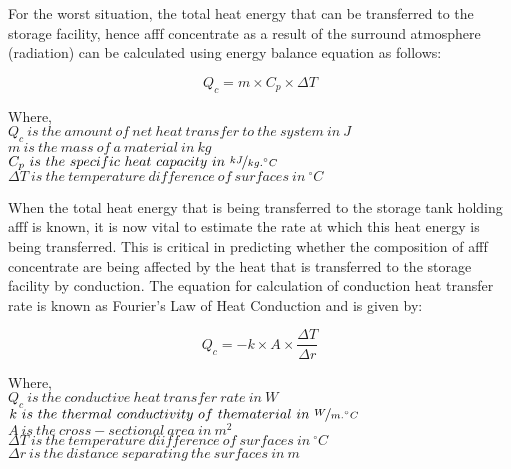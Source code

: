 For the worst situation, the total heat energy that can be transferred to the storage facility, hence \acrshort{afff} concentrate as a result of the surround atmosphere (radiation) can be calculated using energy balance equation as follows:

\begin{equation}
    Q_c = m \times C_p \times \Delta T
\end{equation}

\begin{doublespace}
\noindent Where, \\
$Q_c\ is\ the\ amount\ of\ net\ heat\ transfer\ to\ the\ system\ in\ J$ \\
$m\ is\ the\ mass\ of\ a\ material\ in\ kg$ \\
$C_p\ is\ the\ specific\ heat\ capacity\ in\ \nicefrac{kJ}{kg.^\circ C}$ \\
$\Delta T\ is\ the\ temperature\ difference\ of\ surfaces\ in\ ^\circ C$ \\
\end{doublespace}

When the total heat energy that is being transferred to the storage tank holding \acrshort{afff} is known, it is now vital to estimate the rate at which this heat energy is being transferred. This is critical in predicting whether the composition of \acrshort{afff} concentrate are being affected by the heat that is transferred to the storage facility by conduction. The equation for calculation of conduction heat transfer rate is known as Fourier's Law of Heat Conduction and is given by:

\begin{equation}
    Q_c = -k \times A \times \frac{\Delta T}{\Delta r}
\end{equation}


\begin{doublespace}
\noindent Where, \\
$Q_c\ is\ the\ conductive\ heat\ transfer\ rate\ in\ W$ \\
$k\ is\ the\ thermal\ conductivity\ of\ thematerial\ in\ \nicefrac{W}{m.^\circ C}$ \\
$A\ is\ the\ cross-sectional\ area\ in\ m^2$ \\
$\Delta T\ is\ the\ temperature\ diifference\ of\ surfaces\ in\ ^\circ C$ \\
$\Delta r\ is\ the\ distance\ separating\ the\ surfaces\ in\ m$ \\
\end{doublespace}

